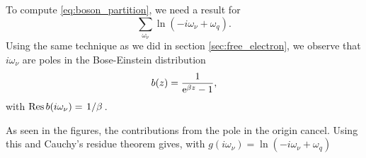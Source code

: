 To compute \eqref{eq:boson_partition}, we need a result for
\begin{equation}
\sum_{\omega_\nu}\ln(-i\omega_\nu +\omega_q).
\end{equation}
Using the same technique as we did in section \ref{sec:free_electron}, we observe that \(i\omega_\nu\) are poles in the Bose-Einstein distribution 
\begin{equation}
b(z) = \frac{1}{\mathrm{e}^{\beta z}-1},
\end{equation}
with \(\Res b(i\omega_\nu) = \flatfrac{1}{\beta} \).
\begin{figure}
\centering

\end{figure}
\begin{figure}
\centering

\end{figure}
As seen in the figures, the contributions from the pole in the origin cancel. Using this and Cauchy's residue theorem gives, with \(g(i\omega_\nu)=\ln(-i\omega_\nu + \omega_q)\)


